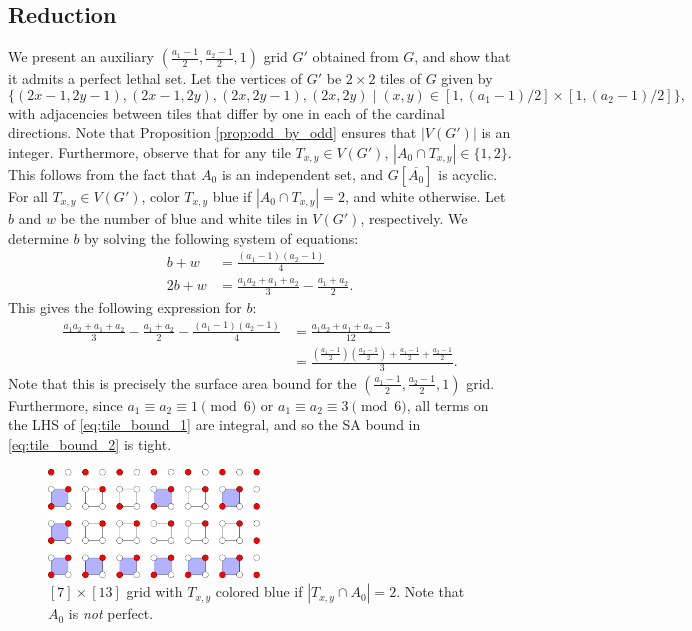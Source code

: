 \subsection{Reduction}
We present an auxiliary $(\frac{a_1-1}{2}, \frac{a_2-1}{2}, 1)$ grid $G'$ obtained from $G$, and show that it admits a perfect lethal set. Let the vertices of $G'$ be $2 \times 2$ tiles of $G$ given by
$$\{(2x-1,2y-1),(2x-1,2y),(2x,2y-1),(2x,2y) \mid (x,y) \in [1, (a_1-1)/2] \times [1, (a_2-1)/2]\},$$
with adjacencies between tiles that differ by one in each of the cardinal directions. Note that Proposition \ref{prop:odd_by_odd} ensures that $|V(G')|$ is an integer. Furthermore, observe that for any tile $T_{x,y} \in V(G')$, $|A_0 \cap T_{x,y}| \in \{1,2\}$. This follows from the fact that $A_0$ is an independent set, and $G[\overline{A_0}]$ is acyclic. For all $T_{x,y} \in V(G')$, color $T_{x,y}$ blue if $|A_0 \cap T_{x,y}| = 2$, and white otherwise. Let $b$ and $w$ be the number of blue and white tiles in $V(G')$, respectively. We determine $b$ by solving the following system of equations:
\begin{align*}
b + w &= \frac{(a_1-1)(a_2-1)}{4} \\
2b + w &= \frac{a_1a_2+a_1+a_2}{3} - \frac{a_1+a_2}{2}.
\end{align*}
This gives the following expression for $b$:
\begin{align}
\frac{a_1a_2+a_1+a_2}{3} - \frac{a_1+a_2}{2} - \frac{(a_1-1)(a_2-1)}{4} &= \frac{a_1a_2+a_1+a_2-3}{12} \label{eq:tile_bound_1} \\
&= \frac{(\frac{a_1-1}{2})(\frac{a_2-1}{2}) + \frac{a_1-1}{2} + \frac{a_2-1}{2}}{3} \label{eq:tile_bound_2}.
\end{align}
Note that this is precisely the surface area bound for the $(\frac{a_1-1}{2}, \frac{a_2-1}{2}, 1)$ grid. Furthermore, since $a_1 \equiv a_2 \equiv 1 \pmod 6$ or $a_1 \equiv a_2 \equiv 3 \pmod 6$, all terms on the LHS of \ref{eq:tile_bound_1} are integral, and so the SA bound in \ref{eq:tile_bound_2} is tight.

\begin{figure}[]
\centering
\includegraphics[width=0.5\textwidth]{figures/6/tiles.pdf}
\caption{$[7] \times [13]$ grid with $T_{x,y}$ colored blue if $|T_{x,y} \cap A_0| = 2$. Note that $A_0$ is \emph{not} perfect.}
\label{fig:tiles}
\end{figure} 


